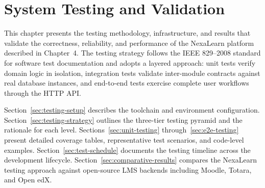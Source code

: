
\chapter{System Testing and Validation}
\label{ch:testing}

This chapter presents the testing methodology, infrastructure, and results that validate the correctness, reliability, and performance of the NexaLearn platform described in Chapter~4. The testing strategy follows the IEEE 829--2008 standard for software test documentation and adopts a layered approach: unit tests verify domain logic in isolation, integration tests validate inter-module contracts against real database instances, and end-to-end tests exercise complete user workflows through the HTTP API.

Section~\ref{sec:testing-setup} describes the toolchain and environment configuration. Section~\ref{sec:testing-strategy} outlines the three-tier testing pyramid and the rationale for each level. Sections~\ref{sec:unit-testing} through~\ref{sec:e2e-testing} present detailed coverage tables, representative test scenarios, and code-level examples. Section~\ref{sec:test-schedule} documents the testing timeline across the development lifecycle. Section~\ref{sec:comparative-results} compares the NexaLearn testing approach against open-source LMS backends including Moodle, Totara, and Open edX.








